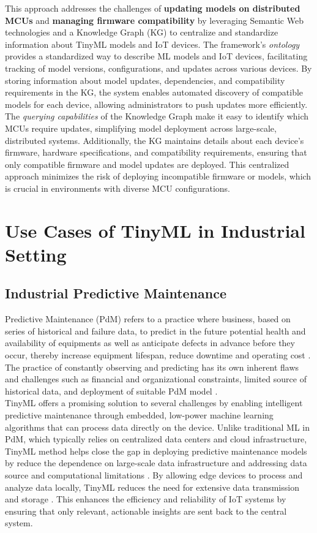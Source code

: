 \documentclass[twocolumn]{article}
\begin{document}
This approach addresses the challenges of \textbf{updating models on distributed MCUs} and \textbf{managing firmware compatibility} by leveraging Semantic Web technologies and a Knowledge Graph (KG) to centralize and standardize information about TinyML models and IoT devices. The framework’s \textit{ontology} provides a standardized way to describe ML models and IoT devices, facilitating tracking of model versions, configurations, and updates across various devices. By storing information about model updates, dependencies, and compatibility requirements in the KG, the system enables automated discovery of compatible models for each device, allowing administrators to push updates more efficiently. The \textit{querying capabilities} of the Knowledge Graph make it easy to identify which MCUs require updates, simplifying model deployment across large-scale, distributed systems. Additionally, the KG maintains details about each device’s firmware, hardware specifications, and compatibility requirements, ensuring that only compatible firmware and model updates are deployed. This centralized approach minimizes the risk of deploying incompatible firmware or models, which is crucial in environments with diverse MCU configurations. 


\section{Use Cases of TinyML in Industrial Setting}
\label{use_cases}

\subsection{Industrial Predictive Maintenance}

Predictive Maintenance (PdM) refers to a practice where business, based on series of historical and failure data, to predict in the future potential health and availability of equipments as well as anticipate defects in advance before they occur, thereby increase equipment lifespan, reduce downtime and operating cost \cite{ooko_application_2024}. The practice of constantly observing and predicting has its own inherent flaws and challenges such as financial and organizational constraints, limited source of historical data, and deployment of suitable PdM model \cite{zonta_predictive_2020}. \\[0.1cm]

TinyML offers a promising solution to several challenges by enabling intelligent predictive maintenance through embedded, low-power machine learning algorithms that can process data directly on the device. Unlike traditional ML in PdM, which typically relies on centralized data centers and cloud infrastructure, TinyML method helps close the gap in deploying predictive maintenance models by reduce the dependence on large-scale data infrastructure and addressing data source and computational limitations \cite{abadade_comprehensive_2023}. By allowing edge devices to process and analyze data locally, TinyML reduces the need for extensive data transmission and storage \cite{ooko_tinyml_2021}. This enhances the efficiency and reliability of IoT systems by ensuring that only relevant, actionable insights are sent back to the central system.
\end{document}
